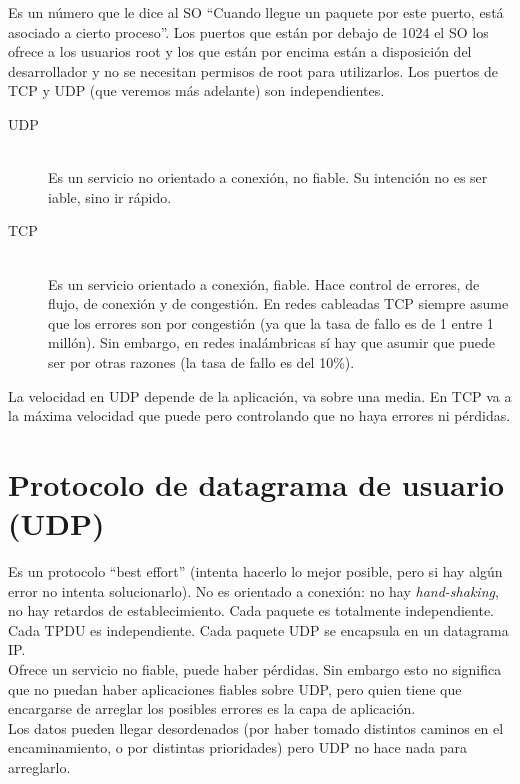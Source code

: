 \begin{definicion}[Puertos]
    Es un número que le dice al SO ``Cuando llegue un paquete por este puerto, está asociado a cierto proceso''. Los puertos que están por debajo de 1024 el SO los ofrece a los usuarios root y los que están por encima están a disposición del desarrollador y no se necesitan permisos de root para utilizarlos. Los puertos de TCP y UDP (que veremos más adelante) son independientes.
\end{definicion}

\begin{description}
    \item [UDP]~\\
        Es un servicio no orientado a conexión, no fiable. Su intención no es ser iable, sino ir rápido.
    \item [TCP]~\\ 
        Es un servicio orientado a conexión, fiable. Hace control de errores, de flujo, de conexión y de congestión. En redes cableadas TCP siempre asume que los errores son por congestión (ya que la tasa de fallo es de 1 entre 1 millón). Sin embargo, en redes inalámbricas sí hay que asumir que puede ser por otras razones (la tasa de fallo es del 10\%).
\end{description}

La velocidad en UDP depende de la aplicación, va sobre una media. En TCP va a la máxima velocidad que puede pero controlando que no haya errores ni pérdidas. 

\section{Protocolo de datagrama de usuario (UDP)}
Es un protocolo ``best effort'' (intenta hacerlo lo mejor posible, pero si hay algún error no intenta solucionarlo). No es orientado a conexión: no hay \textit{hand-shaking}, no hay retardos de establecimiento. Cada paquete es totalmente independiente. Cada \acrlong{TPDU} es independiente. Cada paquete UDP se encapsula en un datagrama IP. \\

Ofrece un servicio no fiable, puede haber pérdidas. Sin embargo esto no significa que no puedan haber aplicaciones fiables sobre UDP, pero quien tiene que encargarse de arreglar los posibles errores es la capa de aplicación.\\

Los datos pueden llegar desordenados (por haber tomado distintos caminos en el encaminamiento, o por distintas prioridades) pero UDP no hace nada para arreglarlo.\\

